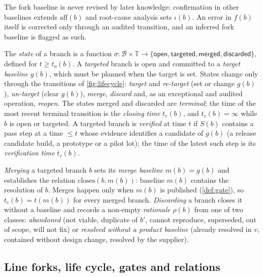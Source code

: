 The fork baseline is never revised by later knowledge: confirmation in
other baselines extends $\mathrm{aff}(b)$ and root-cause analysis sets
$\iota(b)$. An error in $f(b)$ itself is corrected only through an audited
transition, and an inferred fork baseline is flagged as such.

\begin{definition}
  \label{def:state}
  The \emph{state} of a branch is a function
  $\sigma\colon \mathcal{B} \times \mathbb{T} \to \{\textsf{open},
  \textsf{targeted}, \textsf{merged}, \textsf{discarded}\}$, defined for
  $t \ge t_o(b)$. A \emph{targeted} branch is open and committed to a
  \emph{target baseline} $g(b)$, which must be planned when the target is
  set. States change only through the transitions of \cref{fig:lifecycle}:
  \emph{target} and \emph{re-target} (set or change $g(b)$),
  \emph{un-target} (clear $g(b)$), \emph{merge}, \emph{discard} and, as an
  exceptional and audited operation, \emph{reopen}. The states
  \textsf{merged} and \textsf{discarded} are \emph{terminal}; the time of
  the most recent terminal transition is the \emph{closing time} $t_c(b)$,
  and $t_c(b) = \infty$ while $b$ is open or targeted. A targeted branch is
  \emph{verified} at time $t$ if $S(b)$ contains a \textsf{pass} step at a
  time $\le t$ whose evidence identifies a candidate of $g(b)$ (a release
  candidate build, a prototype or a pilot lot); the time of the latest such
  step is its \emph{verification time} $t_r(b)$.
\end{definition}

\begin{definition}
  \label{def:merge}
  \emph{Merging} a targeted branch $b$ sets its \emph{merge baseline}
  $m(b) = g(b)$ and establishes the relation $\mathrm{closes}(b, m(b))$:
  baseline $m(b)$ contains the resolution of $b$. Merges happen only when
  $m(b)$ is published (\cref{def:gate}), so $t_c(b) = t(m(b))$ for every
  merged branch. \emph{Discarding} a branch closes it without a baseline
  and records a non-empty \emph{rationale} $\rho(b)$ from one of two
  classes: \emph{abandoned} (not viable, duplicate of $b'$, cannot
  reproduce, superseded, out of scope, will not fix) or \emph{resolved
  without a product baseline} (already resolved in $v$, contained without
  design change, resolved by the supplier).
\end{definition}

\subsection{Line forks, life cycle, gates and relations}
\label{app:formal-forks}

